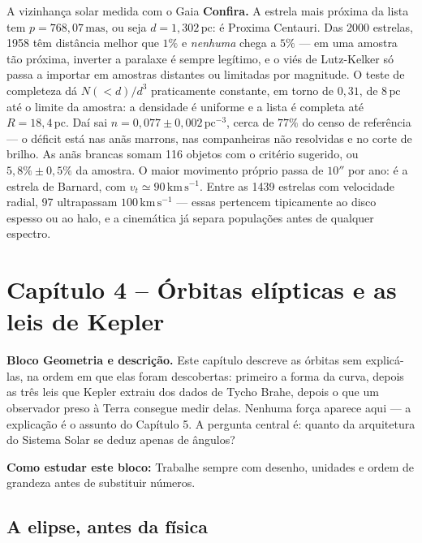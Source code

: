 \documentclass[11pt,a4paper]{article}
\newcommand{\aberturabloco}[3]{%
  \begin{noticebox}
  \textbf{Bloco #1.} #2

  \textbf{Como estudar este bloco:} #3
  \end{noticebox}
}
\begin{document}
\begin{lessonblock}[borderline west={2pt}{0pt}{astroBlue}]{A vizinhança solar medida com o Gaia}
\textbf{Confira.} A estrela mais próxima da lista tem $p=768{,}07\,\mathrm{mas}$, ou seja
$d=1{,}302\,\mathrm{pc}$: é Proxima Centauri. Das 2000 estrelas, 1958 têm distância melhor
que $1\%$ e \emph{nenhuma} chega a $5\%$ --- em uma amostra tão próxima, inverter a
paralaxe é sempre legítimo, e o viés de Lutz-Kelker só passa a importar em amostras
distantes ou limitadas por magnitude. O teste de completeza dá $N(<d)/d^{3}$ praticamente
constante, em torno de $0{,}31$, de $8\,\mathrm{pc}$ até o limite da amostra: a densidade
é uniforme e a lista é completa até $R=18{,}4\,\mathrm{pc}$. Daí sai
$n=0{,}077\pm0{,}002\,\mathrm{pc^{-3}}$, cerca de $77\%$ do censo de referência --- o
déficit está nas anãs marrons, nas companheiras não resolvidas e no corte de brilho. As
anãs brancas somam 116 objetos com o critério sugerido, ou $5{,}8\%\pm0{,}5\%$ da amostra.
O maior movimento próprio passa de $10''$ por ano: é a estrela de Barnard, com
$v_t\simeq90\,\mathrm{km\,s^{-1}}$. Entre as 1439 estrelas com velocidade radial, 97
ultrapassam $100\,\mathrm{km\,s^{-1}}$ --- essas pertencem tipicamente ao disco espesso ou
ao halo, e a cinemática já separa populações antes de qualquer espectro.
\end{lessonblock}

\newpage

\section*{Capítulo 4 -- Órbitas elípticas e as leis de Kepler}
\aberturabloco{Geometria e descrição}{Este capítulo descreve as órbitas sem explicá-las, na ordem em que elas foram descobertas: primeiro a forma da curva, depois as três leis que Kepler extraiu dos dados de Tycho Brahe, depois o que um observador preso à Terra consegue medir delas. Nenhuma força aparece aqui --- a explicação é o assunto do Capítulo 5. A pergunta central é: quanto da arquitetura do Sistema Solar se deduz apenas de ângulos?}{Trabalhe sempre com desenho, unidades e ordem de grandeza antes de substituir números.}

\subsection*{A elipse, antes da física}
\end{document}
